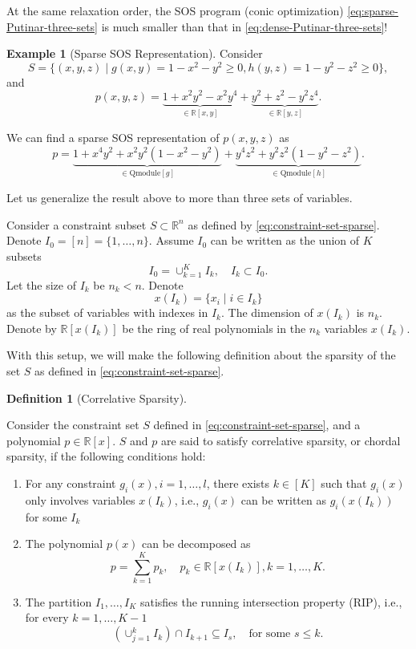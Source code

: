 \documentclass[
]{book}
\theoremstyle{definition}
\newtheorem{definition}{Definition}[chapter]
\theoremstyle{definition}
\newtheorem{example}{Example}[chapter]
\theoremstyle{definition}
\theoremstyle{definition}
\theoremstyle{remark}
\begin{document}
At the same relaxation order, the SOS program (conic optimization) \eqref{eq:sparse-Putinar-three-sets} is much smaller than that in \eqref{eq:dense-Putinar-three-sets}!

\begin{example}[Sparse SOS Representation]
\protect\hypertarget{exm:SparseSOSThreeSets}{}\label{exm:SparseSOSThreeSets}Consider
\[
S = \{ (x,y,z) \mid g(x,y)= 1- x^2 - y^2 \geq 0, h(y,z) = 1 - y^2 - z^2 \geq 0 \},
\]
and
\[
p(x,y,z) = \underbrace{1 + x^2 y^2 - x^2 y^4}_{\in \mathbb{R}[x,y]} + \underbrace{y^2 + z^2 - y^2 z^4}_{ \in \mathbb{R}[y,z]}.
\]

We can find a sparse SOS representation of \(p(x,y,z)\) as
\[
p = \underbrace{1 + x^4 y^2 + x^2 y^2 (1 - x^2 - y^2)}_{\in \mathrm{Qmodule}[g]} + \underbrace{y^4 z^2  + y^2 z^2(1-y^2 - z^2)}_{\in \mathrm{Qmodule}[h]}.
\]
\end{example}

Let us generalize the result above to more than three sets of variables.

Consider a constraint subset \(S \subset \mathbb{R}^{n}\) as defined by \eqref{eq:constraint-set-sparse}. Denote \(I_0 = [n] = \{ 1,\dots,n \}\). Assume \(I_0\) can be written as the union of \(K\) subsets
\[
I_0 = \cup_{k=1}^K I_k, \quad I_k \subset I_0.
\]
Let the size of \(I_k\) be \(n_k < n\). Denote
\[
x(I_k) = \{ x_i \mid i \in I_k \}
\]
as the subset of variables with indexes in \(I_k\). The dimension of \(x(I_k)\) is \(n_k\). Denote by \(\mathbb{R}[x(I_k)]\) be the ring of real polynomials in the \(n_k\) variables \(x(I_k)\).

With this setup, we will make the following definition about the sparsity of the set \(S\) as defined in \eqref{eq:constraint-set-sparse}.

\begin{definition}[Correlative Sparsity]
\protect\hypertarget{def:CorrelativeSparsity}{}\label{def:CorrelativeSparsity}

Consider the constraint set \(S\) defined in \eqref{eq:constraint-set-sparse}, and a polynomial \(p \in \mathbb{R}[x]\). \(S\) and \(p\) are said to satisfy correlative sparsity, or chordal sparsity, if the following conditions hold:

\begin{enumerate}
\def\labelenumi{\arabic{enumi}.}
\item
  For any constraint \(g_i(x),i=1,\dots,l\), there exists \(k \in [K]\) such that \(g_i(x)\) only involves variables \(x(I_k)\), i.e., \(g_i(x)\) can be written as \(g_i(x(I_k))\) for some \(I_k\)
\item
  The polynomial \(p(x)\) can be decomposed as
  \[
  p = \sum_{k=1}^K p_k, \quad p_k \in \mathbb{R}[x(I_k)],k=1,\dots,K.
  \]
\item
  The partition \(I_1,\dots,I_K\) satisfies the running intersection property (RIP), i.e., for every \(k=1,\dots,K-1\)
  \[
  (\cup_{j=1}^k I_k ) \cap I_{k+1} \subseteq I_s, \quad \text{for some } s \leq k.
  \]
\end{enumerate}

\end{definition}
\end{document}

